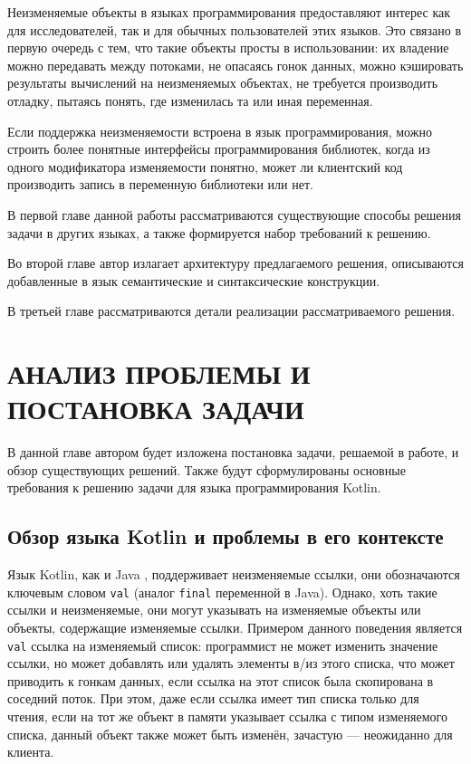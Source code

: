 \documentclass[specification,annotation,times]{itmo-student-thesis}
\begin{document}
Неизменяемые объекты в языках программирования предоставляют интерес как для исследователей, так и для обычных пользователей этих языков.
Это связано в первую очередь с тем, что такие объекты просты в использовании: их
владение можно передавать между потоками, не опасаясь гонок данных, можно кэшировать результаты вычислений на неизменяемых объектах,
не требуется производить отладку, пытаясь понять, где изменилась та или иная переменная.

Если поддержка неизменяемости встроена в язык программирования, можно строить более понятные интерфейсы программирования библиотек,
когда из одного модификатора изменяемости понятно, может ли клиентский код производить запись в переменную библиотеки или нет.

В первой главе данной работы рассматриваются существующие способы решения задачи в других языках, а также формируется набор требований к решению.

Во второй главе автор излагает архитектуру предлагаемого решения, описываются добавленные в язык семантические и синтаксические конструкции.

В третьей главе рассматриваются детали реализации рассматриваемого решения.


\chapter{АНАЛИЗ ПРОБЛЕМЫ И ПОСТАНОВКА ЗАДАЧИ}

В данной главе автором будет изложена постановка задачи, решаемой в работе, и обзор существующих решений.
Также будут сформулированы основные требования к решению задачи для языка программирования Kotlin.

\section{Обзор языка Kotlin и проблемы в его контексте}\label{existing_kotlin}

Язык Kotlin, как и Java \cite{jvm8-spec}, поддерживает неизменяемые ссылки, они обозначаются ключевым словом \texttt{val} (аналог \texttt{final} переменной в Java). 
Однако, хоть такие ссылки и неизменяемые, они могут указывать на изменяемые объекты или объекты, содержащие изменяемые ссылки.
Примером данного поведения является \texttt{val} ссылка на изменяемый список: программист не может изменить значение ссылки, но может добавлять или удалять элементы в/из этого списка, что может приводить к гонкам данных, если ссылка на этот список была скопирована в соседний поток.
При этом, даже если ссылка имеет тип списка только для чтения, если на тот же объект в памяти указывает ссылка с типом изменяемого списка, данный объект также может быть изменён, зачастую --- неожиданно для клиента.
\end{document}
